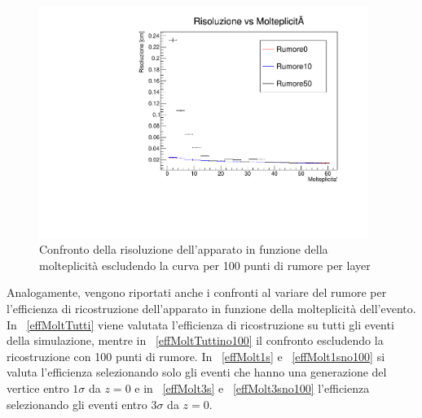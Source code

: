 \documentclass[11pt,a4paper]{article}
\begin{document}
\begin{figure}[h!]
{\begin{minipage}[r]{.48\textwidth}
     \includegraphics[width=0.95\textwidth]{Immagini/risoluzione_0_no_rumore100.pdf}
  \vspace{-5pt}
     \caption{Confronto della risoluzione dell'apparato in funzione della molteplicità escludendo la curva per 100 punti di rumore per layer}
  \label{RumoreRismoltno100}
   \end{minipage}}
  \vspace{-50pt}
\end{figure}

\newpage
\par Analogamente, vengono riportati anche i confronti al variare del rumore per l'efficienza di ricostruzione dell'apparato in funzione della molteplicità dell'evento. In \figurename~\ref{effMoltTutti} viene valutata l'efficienza di ricostruzione su tutti gli eventi della simulazione, mentre in \figurename~\ref{effMoltTuttino100} il confronto escludendo la ricostruzione con 100 punti di rumore. In \figurename~\ref{effMolt1s} e \figurename~\ref{effMolt1sno100} si valuta l'efficienza selezionando solo gli eventi che hanno una generazione del vertice entro $1\sigma$ da $z=0$ e in \figurename~\ref{effMolt3s} e \figurename~\ref{effMolt3sno100} l'efficienza selezionando gli eventi entro $3\sigma$ da $z=0$.
\end{document}
